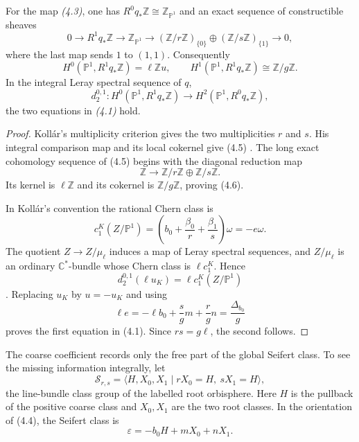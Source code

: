 \documentclass[11pt]{article}
\numberwithin{equation}{section}
\begin{document}
\begin{theorem}
For the map \emph{(4.3)}, one has $R^0q_*\mathbb Z\cong
\mathbb Z_{\mathbb P^1}$ and an exact sequence of constructible sheaves
\[
 0\longrightarrow R^1q_*\mathbb Z\longrightarrow
 \mathbb Z_{\mathbb P^1}\longrightarrow
 (\mathbb Z/r\mathbb Z)_{\{0\}}\oplus
 (\mathbb Z/s\mathbb Z)_{\{1\}}\longrightarrow0,                \tag{4.5}
\]
where the last map sends $1$ to $(1,1)$.  Consequently
\[
 H^0(\mathbb P^1,R^1q_*\mathbb Z)=\ell\mathbb Z u,
 \qquad
 H^1(\mathbb P^1,R^1q_*\mathbb Z)\cong\mathbb Z/g\mathbb Z.     \tag{4.6}
\]
In the integral Leray spectral sequence of $q$,
\[
 d_2^{0,1}:H^0(\mathbb P^1,R^1q_*\mathbb Z)
       \longrightarrow H^2(\mathbb P^1,R^0q_*\mathbb Z),        \tag{4.7}
\]
the two equations in \emph{(4.1)} hold.
\end{theorem}

\begin{proof}
Koll\'ar's multiplicity criterion gives the two multiplicities $r$ and $s$.
His integral comparison map and its local cokernel give (4.5)
\cite[Theorem~7 and Propositions~43 and 47]{Kollar}.  The long exact
cohomology sequence of (4.5) begins with the diagonal reduction map
\[
 \mathbb Z\longrightarrow\mathbb Z/r\mathbb Z\oplus
 \mathbb Z/s\mathbb Z.
\]
Its kernel is $\ell\mathbb Z$ and its cokernel is
$\mathbb Z/g\mathbb Z$, proving (4.6).

In Koll\'ar's convention the rational Chern class is
\[
 c_1^K(Z/\mathbb P^1)
   =\left(b_0+\frac{\beta_0}{r}+\frac{\beta_1}{s}\right)\omega
   =-e\omega.                                                     \tag{4.8}
\]
The quotient $Z\to Z/\mu_\ell$ induces a map of Leray spectral sequences,
and $Z/\mu_\ell$ is an ordinary $\mathbb C^*$-bundle whose Chern class is
$\ell c_1^K$.  Hence
\[
 d_2^{0,1}(\ell u_K)=\ell c_1^K(Z/\mathbb P^1)
\]
\cite[Definition~9, Map~13, and Corollary~44]{Kollar}.  Replacing $u_K$ by
$u=-u_K$ and using
\[
 \ell e=-\ell b_0+\frac{s}{g}m+\frac{r}{g}n
          =\frac{\Delta_{b_0}}g
\]
proves the first equation in (4.1).  Since $rs=g\ell$, the second follows.
\end{proof}

The coarse coefficient records only the free part of the global Seifert
class.  To see the missing information integrally, let
\[
 \mathcal S_{r,s}
 =\langle H,X_0,X_1\mid rX_0=H,\ sX_1=H\rangle,                  \tag{4.9}
\]
the line-bundle class group of the labelled root orbisphere.  Here $H$ is
the pullback of the positive coarse class and $X_0,X_1$ are the two root
classes.  In the orientation of (4.4), the Seifert class is
\[
                  \varepsilon=-b_0H+mX_0+nX_1.                  \tag{4.10}
\]
\end{document}
